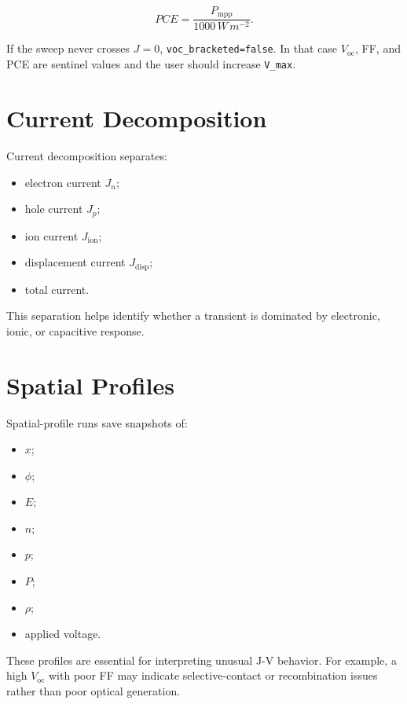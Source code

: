 \documentclass[
  11pt,
  american,
]{report}
\providecommand{\tightlist}{%
  \setlength{\itemsep}{0pt}\setlength{\parskip}{0pt}}
\begin{document}
\[
PCE=\frac{P_\mathrm{mpp}}{1000\,W\,m^{-2}}.
\]

If the sweep never crosses \(J=0\), \texttt{voc\_bracketed=false}. In
that case \(V_\mathrm{oc}\), FF, and PCE are sentinel values and the
user should increase \texttt{V\_max}.

\hypertarget{current-decomposition}{%
\section{Current Decomposition}\label{current-decomposition}}

Current decomposition separates:

\begin{itemize}
\tightlist
\item
  electron current \(J_n\);
\item
  hole current \(J_p\);
\item
  ion current \(J_\mathrm{ion}\);
\item
  displacement current \(J_\mathrm{disp}\);
\item
  total current.
\end{itemize}

This separation helps identify whether a transient is dominated by
electronic, ionic, or capacitive response.

\hypertarget{spatial-profiles}{%
\section{Spatial Profiles}\label{spatial-profiles}}

Spatial-profile runs save snapshots of:

\begin{itemize}
\tightlist
\item
  \(x\);
\item
  \(\phi\);
\item
  \(E\);
\item
  \(n\);
\item
  \(p\);
\item
  \(P\);
\item
  \(\rho\);
\item
  applied voltage.
\end{itemize}

These profiles are essential for interpreting unusual J-V behavior. For
example, a high \(V_\mathrm{oc}\) with poor FF may indicate
selective-contact or recombination issues rather than poor optical
generation.
\end{document}
